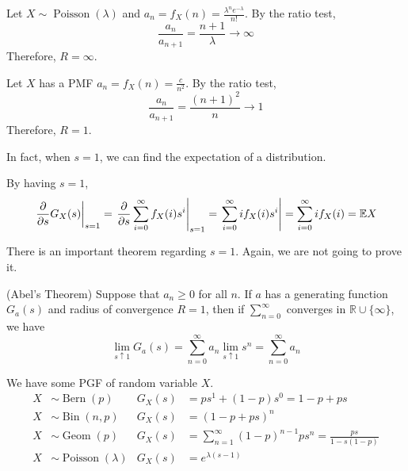 \documentclass{huhtakm-template-book}
\newcommand{\expect}{\mathbb{E}}
\DeclareMathOperator{\Bern}{Bern}
\DeclareMathOperator{\Bin}{Bin}
\DeclareMathOperator{\Geom}{Geom}
\DeclareMathOperator{\Poisson}{Poisson}
\begin{document}
    \newpage
    \begin{eg}
        Let $X\sim\Poisson(\lambda)$ and $a_{n}=f_{X}(n)=\frac{\lambda^{n}e^{-\lambda}}{n!}$. By the ratio test,
        \begin{equation*}
            \frac{a_{n}}{a_{n+1}}=\frac{n+1}{\lambda}\to\infty
        \end{equation*}
        Therefore, $R=\infty$.
    \end{eg}
    \begin{eg}
        Let $X$ has a PMF $a_{n}=f_{X}(n)=\frac{c}{n^{2}}$. By the ratio test,
        \begin{equation*}
            \frac{a_{n}}{a_{n+1}}=\frac{(n+1)^{2}}{n}\to 1
        \end{equation*}
        Therefore, $R=1$.
    \end{eg}
    In fact, when $s=1$, we can find the expectation of a distribution.
    \begin{eg}
        \label{Expectation from PGF}
        By having $s=1$,
        \begin{equation*}
            \left.\pdv*{G_{X}(s)}{s}\right|_{s=1}=\left.\pdv*{\sum_{i=0}^{\infty}f_{X}(i)s^{i}}{s}\right|_{s=1}=\left.\sum_{i=0}^{\infty}if_{X}(i)s^{i}\right|=\sum_{i=0}^{\infty}if_{X}(i)=\expect X
        \end{equation*}
    \end{eg}
    There is an important theorem regarding $s=1$. Again, we are not going to prove it.
    \begin{thm}(Abel's Theorem)
        Suppose that $a_{n}\geq 0$ for all $n$. If $a$ has a generating function $G_{a}(s)$ and radius of convergence $R=1$, then if $\sum_{n=0}^{\infty}$ converges in $\mathbb{R}\cup\{\infty\}$, we have
        \begin{equation*}
            \lim_{s\uparrow 1}G_{a}(s)=\sum_{n=0}^{\infty}a_{n}\lim_{s\uparrow 1}s^{n}=\sum_{n=0}^{\infty}a_{n}
        \end{equation*}
    \end{thm}
    \begin{eg}
        We have some PGF of random variable $X$.
        \begin{align*}
            X&\sim\Bern(p) & G_{X}(s)&=ps^{1}+(1-p)s^{0}=1-p+ps\\
            X&\sim\Bin(n,p) & G_{X}(s)&=(1-p+ps)^{n}\\
            X&\sim\Geom(p) & G_{X}(s)&=\sum_{n=1}^{\infty}(1-p)^{n-1}ps^{n}=\frac{ps}{1-s(1-p)}\\
            X&\sim\Poisson(\lambda) & G_{X}(s)&=e^{\lambda(s-1)}
        \end{align*}
    \end{eg}
\end{document}
